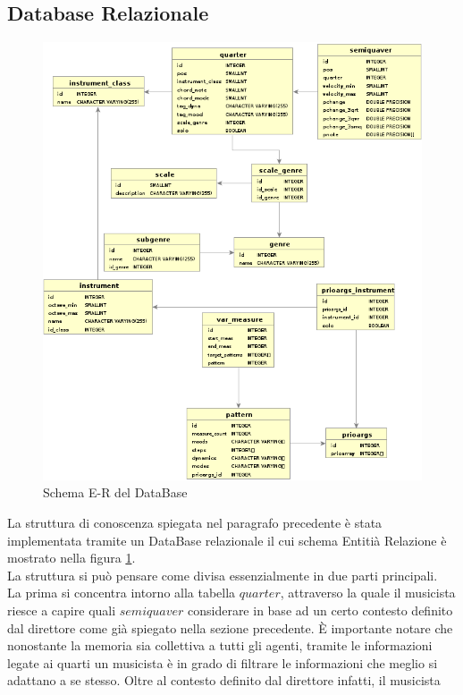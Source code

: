 \subsection{Database Relazionale}
\begin{figure}[H]
\centering
\includegraphics[scale=0.7]{img/db.png}
\caption{Schema E-R del DataBase}
\label{figure-db}
\end{figure}
La struttura di conoscenza spiegata nel paragrafo precedente è stata implementata
tramite un DataBase relazionale il cui schema Entitià Relazione è mostrato nella figura
\ref{figure-db}.\\
La struttura si può pensare come divisa essenzialmente in due parti principali.\\ 
La prima si concentra intorno alla tabella $quarter$, attraverso la quale il musicista
riesce a capire quali $semiquaver$ considerare in base ad un certo contesto definito
dal direttore come già spiegato nella sezione precedente. È importante notare che 
nonostante la memoria sia collettiva a tutti gli agenti, tramite le informazioni 
legate ai quarti un musicista è in grado di filtrare le informazioni che meglio si
adattano a se stesso. Oltre al contesto definito dal direttore infatti, il musicista
